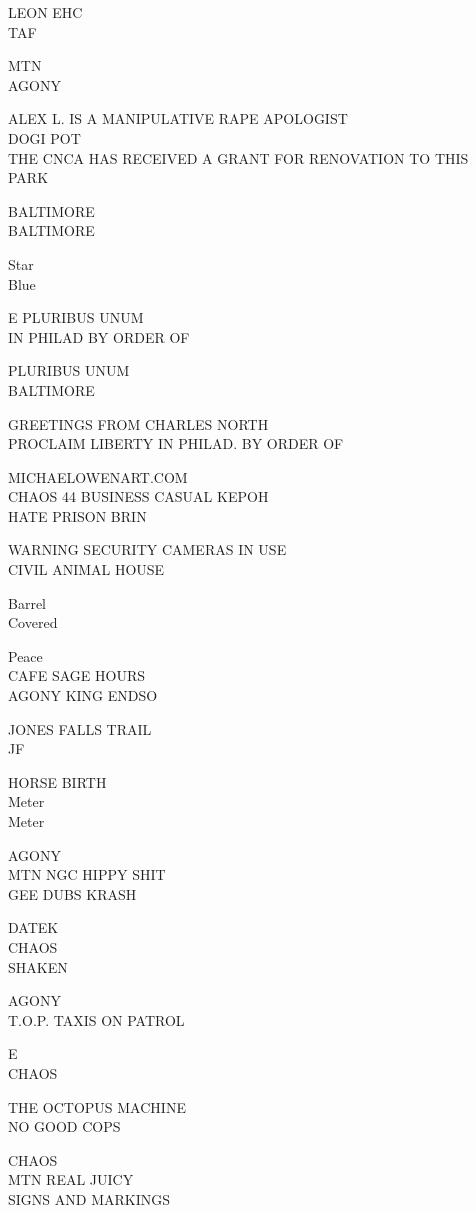 \documentclass[10pt,letterpaper]{article}
\begin{document}
LEON EHC\\
TAF

MTN\\
AGONY

ALEX L. IS A MANIPULATIVE RAPE APOLOGIST\\
DOGI POT\\
THE CNCA HAS RECEIVED A GRANT FOR RENOVATION TO THIS PARK

BALTIMORE\\
BALTIMORE

Star\\
Blue

E PLURIBUS UNUM\\
IN PHILAD BY ORDER OF

PLURIBUS UNUM\\
BALTIMORE

GREETINGS FROM CHARLES NORTH\\
PROCLAIM LIBERTY IN PHILAD. BY ORDER OF

MICHAELOWENART.COM\\
CHAOS 44 BUSINESS CASUAL KEPOH\\
HATE PRISON BRIN

WARNING SECURITY CAMERAS IN USE\\
CIVIL ANIMAL HOUSE

Barrel\\
Covered

Peace\\
CAFE SAGE HOURS\\
AGONY KING ENDSO

JONES FALLS TRAIL\\
JF

HORSE BIRTH\\
Meter\\
Meter

AGONY\\
MTN NGC HIPPY SHIT\\
GEE DUBS KRASH

DATEK\\
CHAOS\\
SHAKEN

AGONY\\
T.O.P. TAXIS ON PATROL

E\\
CHAOS

THE OCTOPUS MACHINE\\
NO GOOD COPS

CHAOS\\
MTN REAL JUICY\\
SIGNS AND MARKINGS
\end{document}
